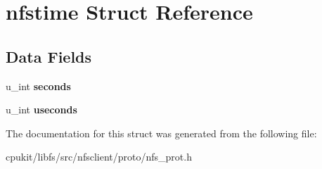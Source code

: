 \hypertarget{structnfstime}{}\section{nfstime Struct Reference}
\label{structnfstime}
\subsection*{Data Fields}
\begin{DoxyCompactItemize}
\item 
\mbox{\label{structnfstime_a425c036ebe97548bbdadae9ef5c74532}} 
u\+\_\+int {\bfseries seconds}
\item 
\mbox{\label{structnfstime_af97bdeb6ffacb06f8cda57e4288d95e0}} 
u\+\_\+int {\bfseries useconds}
\end{DoxyCompactItemize}


The documentation for this struct was generated from the following file\+:\begin{DoxyCompactItemize}
\item 
cpukit/libfs/src/nfsclient/proto/nfs\+\_\+prot.\+h\end{DoxyCompactItemize}
